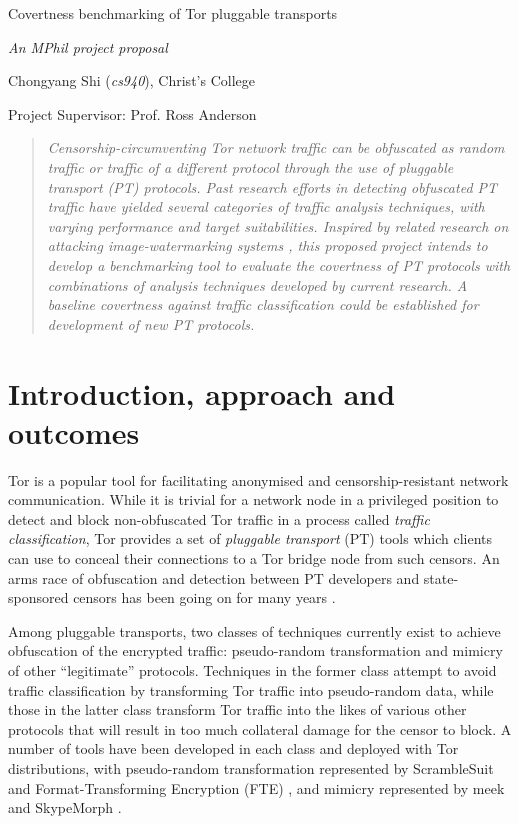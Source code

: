 \documentclass[11pt]{article}
\begin{document}
\centerline{\Large Covertness benchmarking of Tor pluggable transports}
\vspace{2em}
\centerline{\Large \emph{An MPhil project proposal}}
\vspace{2em}
\centerline{\large Chongyang Shi (\emph{cs940}), Christ's College}
\vspace{1em}
\centerline{\large Project Supervisor: Prof. Ross Anderson}
\vspace{1em}

\begin{abstract}
\textsl{Censorship-circumventing Tor network traffic can be obfuscated as random traffic or traffic of a different protocol through the use of pluggable transport (PT) protocols. Past research efforts in detecting obfuscated PT traffic have yielded several categories of traffic analysis techniques, with varying performance and target suitabilities. Inspired by related research on attacking image-watermarking systems \cite{petitcolas1998attacks}, this proposed project intends to develop a benchmarking tool to evaluate the covertness of PT protocols with combinations of analysis techniques developed by current research. A baseline covertness against traffic classification could be established for development of new PT protocols.} 
\end{abstract}

\section{Introduction, approach and outcomes}

Tor is a popular tool for facilitating anonymised and censorship-resistant network communication. While it is trivial for a network node in a privileged position to detect and block non-obfuscated Tor traffic \cite[Tb. 6] {bujlow2015independent} in a process called \emph{traffic classification}, Tor provides a set of \emph{pluggable transport} (PT) tools which clients can use to conceal their connections to a Tor bridge node from such censors. An arms race of obfuscation and detection between PT developers and state-sponsored censors has been going on for many years \cite{khattak2014systemization}. 

Among pluggable transports, two classes of techniques currently exist to achieve obfuscation of the encrypted traffic: pseudo-random transformation and mimicry of other ``legitimate'' protocols. Techniques in the former class attempt to avoid traffic classification by transforming Tor traffic into pseudo-random data, while those in the latter class transform Tor traffic into the likes of various other protocols that will result in too much collateral damage for the censor to block. A number of tools have been developed in each class and deployed with Tor distributions, with pseudo-random transformation represented by ScrambleSuit \cite{winter2013scramblesuit} and Format-Transforming Encryption (FTE) \cite{dyer2013protocol}, and mimicry represented by meek \cite{fifield2015blocking} and SkypeMorph \cite{mohajeri2012skypemorph}. 
\end{document}
